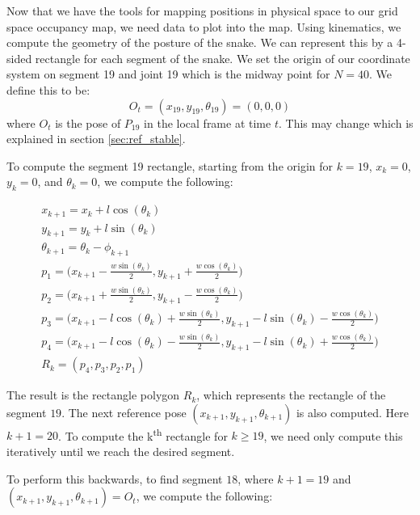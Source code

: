 Now that we have the tools for mapping positions in physical space to our grid space occupancy map, we need data to plot into the map.  Using kinematics, we compute the geometry of the posture of the snake.  We can represent this by a 4-sided rectangle for each segment of the snake.  We set the origin of our coordinate system on segment 19 and joint 19 which is the midway point for $N = 40$.  We define this to be:
\begin{equation}
O_t = (x_{19}, y_{19}, \theta_{19}) = (0, 0, 0)
\end{equation}
where $O_t$ is the pose of $P_{19}$ in the local frame at time $t$.  This may change which is explained in section \ref{sec:ref_stable}.

To compute the segment 19 rectangle, starting from the origin for $k = 19$, $x_k = 0$, $y_k = 0$, and $\theta_k = 0$, we compute the following:

\begin{equation}
\label{equ:rect1}
\begin{array}{l}
\displaystyle x_{k+1} = x_k + l \cos(\theta_k) \\
\displaystyle y_{k+1} = y_k + l \sin(\theta_k) \\
\displaystyle \theta_{k+1} = \theta_k - \phi_{k+1} \\
\displaystyle p_1 = \bigg( x_{k+1} - \frac{w\sin(\theta_k)}{2} , y_{k+1} + \frac{w\cos(\theta_k)}{2}\bigg) \\
\displaystyle p_2 = \bigg( x_{k+1} + \frac{w\sin(\theta_k)}{2}, y_{k+1} - \frac{w\cos(\theta_k)}{2} \bigg) \\
\displaystyle p_3 = \bigg( x_{k+1} - l\cos(\theta_k) + \frac{w\sin(\theta_k)}{2}, y_{k+1} - l\sin(\theta_k) - \frac{w\cos(\theta_k)}{2} \bigg) \\
\displaystyle p_4 = \bigg( x_{k+1} - l\cos(\theta_k) - \frac{w\sin(\theta_k)}{2}, y_{k+1} - l\sin(\theta_k) + \frac{w\cos(\theta_k)}{2} \bigg) \\
\displaystyle R_k = (p_4,p_3,p_2,p_1)
\end{array}
\end{equation}

The result is the rectangle polygon $R_k$, which represents the rectangle of the segment $19$.  The next reference pose $(x_{k+1},y_{k+1},\theta_{k+1})$ is also computed.  Here $k+1=20$.  To compute the k\textsuperscript{th} rectangle for $k \geq 19$, we need only compute this iteratively until we reach the desired segment.

To perform this backwards, to find segment $18$, where $k+1=19$ and $(x_{k+1}, y_{k+1}, \theta_{k+1}) = O_t$, we compute the following:

